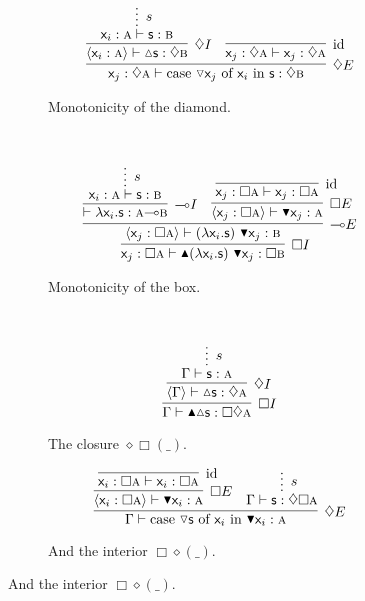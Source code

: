 \begin{figure}
	\centering
	\begin{subfigure}{1\textwidth}
		\[
			\infer[\diamond E]{\term{\varj}: \diamond \prop{a} \vdash  \cterm{case \term{\diaelim \varj} of \term{\vari } in \term{s}}: \diamond \prop{b}}{
					\infer[\diamond I]{\bracket{\term{\vari }: \prop{a}} \vdash \diaintro \term{s}: \diamond \prop{b}}{
						\infer*[s]{\term{\vari }: \prop{a} \vdash \term{s}: \prop{b}}{}
					}
					&
					\infer[\Ax]{\term{\varj}: \diamond \prop{a} \vdash \term{\varj}: \diamond \prop{a}}{}
			}
		\]
		\caption{Monotonicity of the diamond.}
		\label{subfigure:modal_properties:diamond_mono}
	\end{subfigure}\\[\midsep]
	\begin{subfigure}{1\textwidth}
		\[
			\infer[\Box I]{\term{\varj}: \Box \prop{a} \vdash \boxintro{(\term{\lam \vari .s})~\term{\boxelim \varj}}:\Box \prop{b}}{
				\infer[\li E]{\bracket{\term{\varj}: \Box \prop{a}} \vdash (\term{\lam \vari .s})~\term{\boxelim \varj}: \prop{b}}{
					\infer[\li I]{\vdash \term{\lam \vari .s}: \prop{a} \li\prop{b}}{
						\infer*[s]{\term{\vari }: \prop{a} \vdash \term{s}: \prop{b}}{}
					}
					&
					\infer[\Box E]{\bracket{\term{\varj}: \Box \prop{a}} \vdash \boxelim\term{\varj}:\prop{a}}{	
						\infer[\Ax]{\term{\varj}: \Box\prop{a} \vdash \term{\varj}: \Box\prop{a}}{}
					}
				}
			}
		\]
		\caption{Monotonicity of the box.}
		\label{subfigure:modal_properties:box_mono}
	\end{subfigure}\\[\midsep]
	\begin{subfigure}{0.4\textwidth}
		\[
		\infer[\Box I]{\Gamma \vdash \boxintro\diaintro\term{s}:\Box \diamond \prop{a}}{
			\infer[\diamond I]{\bracket{\Gamma} \vdash \diaintro\term{s}: \diamond \prop{a}}{
				\infer*[s]{\Gamma \vdash \term{s}: \prop{a}}{}
			}
		}
		\]
		\caption{The closure $\diamond\Box(\_)$.}
		\label{subfigure:modal_properties:closure}
	\end{subfigure}%
	\begin{subfigure}{0.5\textwidth}
		\[
		\infer[\diamond E]{\Gamma \vdash \cterm{case \term{\diaelim{s}} of \term{\vari } in \term{\boxelim \vari }}: \prop{a}}{
						\infer[\Box E]{\bracket{\term{\vari }: \Box \prop{a}}\vdash \boxelim\term{\vari }:\prop{a}}{
							\infer[\Ax]{\term{\vari }: \Box\prop{a} \vdash \term{\vari }: \Box\prop{a}}{}
						}
						&
						\infer*[s]{\Gamma\vdash \term{s}: \diamond \Box \prop{a}}{}
				}
		\]
		\caption{And the interior $\Box\diamond(\_)$.}

\end{subfigure}
\end{figure}

